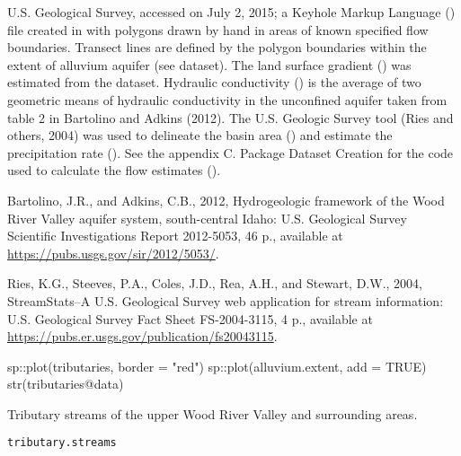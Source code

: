 \documentclass[a4paper]{book}
\begin{document}
%
\begin{Source}\relax
U.S. Geological Survey, accessed on July 2, 2015;
a Keyhole Markup Language () file created in
 with polygons drawn by hand in
areas of known specified flow boundaries.
Transect lines are defined by the polygon boundaries within the extent of
alluvium aquifer (see  dataset).
The land surface gradient () was estimated from the
 dataset.
Hydraulic conductivity () is the average of two geometric means of hydraulic conductivity
in the unconfined aquifer taken from table 2 in Bartolino and Adkins (2012).
The U.S. Geologic Survey  tool
(Ries and others, 2004) was used to delineate the basin area () and
estimate the precipitation rate ().
See the appendix C. Package Dataset Creation for the \R{} code used to calculate the
flow estimates ().
\end{Source}
%
\begin{References}\relax
Bartolino, J.R., and Adkins, C.B., 2012, Hydrogeologic framework of the
Wood River Valley aquifer system, south-central Idaho: U.S. Geological Survey
Scientific Investigations Report 2012-5053, 46 p.,
available at \url{https://pubs.usgs.gov/sir/2012/5053/}.

Ries, K.G., Steeves, P.A., Coles, J.D., Rea, A.H., and Stewart, D.W., 2004,
StreamStats--A U.S. Geological Survey web application for stream information:
U.S. Geological Survey Fact Sheet FS-2004-3115, 4 p., available at
\url{https://pubs.er.usgs.gov/publication/fs20043115}.
\end{References}
%
\begin{Examples}
\begin{ExampleCode}
sp::plot(tributaries, border = "red")
sp::plot(alluvium.extent, add = TRUE)
str(tributaries@data)

\end{ExampleCode}
\end{Examples}
%
\begin{Description}\relax
Tributary streams of the upper Wood River Valley and surrounding areas.
\end{Description}
%
\begin{Usage}
\begin{verbatim}
tributary.streams
\end{verbatim}
\end{Usage}
\end{document}
